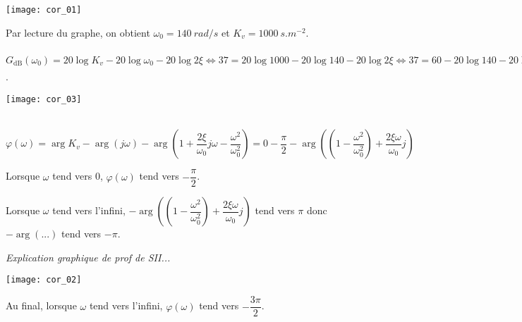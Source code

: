 
\ifprof 
\begin{marginfigure}
\texttt{[image: cor\_01]}
\end{marginfigure}

\begin{corrige}

Par lecture du graphe, on obtient $\omega_0=\SI{140}{rad/s}$ et $K_v=\SI{1000}{s.m^{-2}}$.

$G_{\text{dB}}\left(\omega_0 \right)=
20\log K_v- 20\log  \omega_0 - 20\log 2\xi 
\Leftrightarrow 37=20\log 1000 - 20\log  140 - 20\log 2\xi
\Leftrightarrow 37=60 - 20\log  140 - 20\log 2\xi
\Leftrightarrow \dfrac{37-60 + 20\log  140}{-20} =\log 2\xi
\Leftrightarrow  \xi \simeq 0,05
$.

\end{corrige} \else \fi



\ifprof 

\begin{marginfigure}
\texttt{[image: cor\_03]}
\end{marginfigure}

\begin{corrige} ~\\

$
\varphi\left(  \omega\right)
=\arg K_v- \arg \left( j\omega\right) - \arg  \left( 1+\dfrac{2\xi}{\omega_0} j\omega - \dfrac{\omega^2}{\omega_0^2}  \right)
=0-\dfrac{\pi}{2} - \arg  \left( \left( 1 - \dfrac{\omega^2}{\omega_0^2}\right) + \dfrac{2\xi\omega}{\omega_0} j \right)
$

Lorsque $\omega$ tend vers 0, $\varphi\left(\omega\right)$ 
tend vers $-\dfrac{\pi}{2}$. 

Lorsque $\omega$ tend vers l'infini,
$-\arg  \left( \left( 1 - \dfrac{\omega^2}{\omega_0^2}\right) + \dfrac{2\xi\omega}{\omega_0} j \right)$ tend vers $\pi$ donc $-\arg(...)$ tend vers $-\pi$.

\textit{Explication graphique de prof de SII...}
\begin{center}
\texttt{[image: cor\_02]}
\end{center}
Au final, lorsque $\omega$ tend vers l'infini, $\varphi(\omega)$ tend vers $-\dfrac{3\pi}{2}$.

\end{corrige} 



